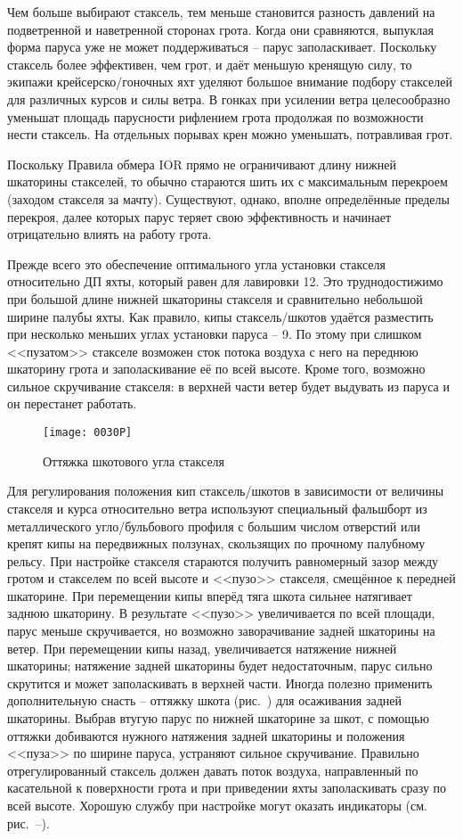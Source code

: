 Чем больше выбирают стаксель, тем меньше становится разность давлений
на подветренной и наветренной сторонах грота. Когда они сравняются,
выпуклая форма паруса уже не может поддерживаться \--- парус
заполаскивает. Поскольку стаксель более эффективен, чем грот, и даёт
меньшую кренящую силу, то экипажи крейсерско\-/гоночных яхт уделяют
большое внимание подбору стакселей для различных курсов и силы
ветра. В гонках при усилении ветра целесообразно уменьшат площадь
парусности рифлением грота продолжая по возможности нести стаксель. На
отдельных порывах крен можно уменьшать, потравливая грот.

Поскольку Правила обмера IOR прямо не ограничивают длину нижней
шкаторины стакселей, то обычно стараются шить их с максимальным
перекроем (заходом стакселя за мачту). Существуют, однако, вполне
определённые пределы перекроя, далее которых парус теряет свою
эффективность и начинает отрицательно влиять на работу грота.

Прежде всего это обеспечение оптимального угла установки стакселя
относительно ДП яхты, который равен для лавировки 12\gr. Это
труднодостижимо при большой длине нижней шкаторины стакселя и
сравнительно небольшой ширине палубы яхты. Как правило, кипы
стаксель\-/шкотов удаётся разместить при несколько меньших углах
установки паруса \--- 9\gr. По этому при слишком <<пузатом>>
стакселе возможен сток потока воздуха с него на переднюю шкаторину
грота и заполаскивание её по всей высоте. Кроме того, возможно сильное
скручивание стакселя: в верхней части ветер будет выдувать из паруса и
он перестанет работать.

\begin{figure}[htb]
  \centering
  \texttt{[image: 0030P]}
  \caption{Оттяжка шкотового угла стакселя}
  \label{fig:30}
\end{figure}

Для регулирования положения кип стаксель\-/шкотов в зависимости от
величины стакселя и курса относительно ветра используют специальный
фальшборт из металлического угло\-/бульбового профиля с большим числом
отверстий или крепят кипы на передвижных ползунах, скользящих по
прочному палубному рельсу. При настройке стакселя стараются получить
равномерный зазор между гротом и стакселем по всей высоте и <<пузо>>
стакселя, смещённое к передней шкаторине. При перемещении кипы вперёд
тяга шкота сильнее натягивает заднюю шкаторину. В результате <<пузо>>
увеличивается по всей площади, парус меньше скручивается, но возможно
заворачивание задней шкаторины на ветер. При перемещении кипы назад,
увеличивается натяжение нижней шкаторины; натяжение задней шкаторины
будет недостаточным, парус сильно скрутится и может заполаскивать в
верхней части. Иногда полезно применить дополнительную снасть \---
оттяжку шкота (рис.~) для осаживания задней шкаторины. Выбрав
втугую парус по нижней шкаторине за шкот, с помощью оттяжки добиваются
нужного натяжения задней шкаторины и положения <<пуза>> по ширине
паруса, устраняют сильное скручивание. Правильно отрегулированный
стаксель должен давать поток воздуха, направленный по касательной к
поверхности грота и при приведении яхты заполаскивать сразу по всей
высоте. Хорошую службу при настройке могут оказать индикаторы
(см. рис.~--).


